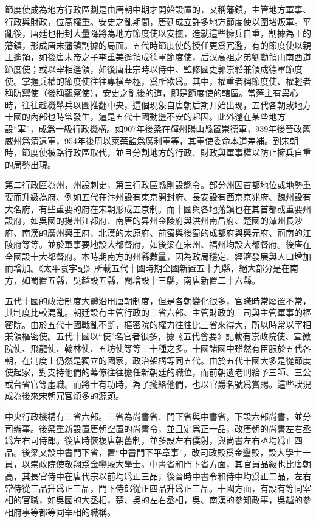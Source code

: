 節度使成為地方行政區劃是由唐朝中期才開始設置的，又稱藩鎮，主管地方軍事、行政與財政，位高權重。安史之亂期間，唐廷成立許多地方節度使以圍堵叛軍。平亂後，唐廷也冊封大量降將為地方節度使以安撫，造就這些擁兵自重，割據為王的藩鎮，形成唐末藩鎮割據的局面。五代時節度使的授任更爲冗濫，有的節度使以親王遙領，如後唐末帝之子李重美遙領成德軍節度使，后汉高祖之弟劉勳領山南西道節度使；或以宰相遙領，如後唐莊宗時以侍中、監修國史郭崇韜兼領成德軍節度使。掌握兵權的節度使往往專横至極，爲所欲爲。其中，權重者稱節度使、權輕者稱防禦使（後稱觀察使），安史之亂後的道，即是節度使的轄區。當藩主有異心時，往往趁機舉兵以圖推翻中央，這個現象自唐朝后期开始出现，五代各朝或地方十國的內部也時常發生，這是五代十國動盪不安的起因。此外還在某些地方設“軍”，成爲一級行政機構。如907年後梁在輝州碭山縣置崇德軍，939年後晉改舊威州爲清遠軍，954年後周以萊蕪監爲廣利軍等，其軍使委命本道差補。到宋朝時，節度使被路行政區取代，並且分割地方的行政、財政與軍事權以防止擁兵自重的局勢出現。

第二行政區為州，州設刺史，第三行政區縣則設縣令。部分州因首都地位或地勢重要而升級為府、例如五代在汴州設有東京開封府、長安設有西京京兆府、魏州設有大名府，有些重要的府在宋朝形成五京制。而十國與各地藩鎮也在其首都或重要州設府，如吳國的揚州江都府、南唐的昇州金陵府與洪州南昌府、楚國的潭州長沙府、南漢的廣州興王府、北漢的太原府、前蜀與後蜀的成都府與興元府、荊南的江陵府等等。並於軍事要地設大都督府，如後梁在宋州、福州均設大都督府。後唐在全國設十大都督府。本時期南方的州縣數量，因為政局穩定、經濟發展與人口增加而增加。《太平寰宇記》所載五代十國時期全國新置五十九縣，絕大部分是在南方，如蜀置五縣，吳越設五縣，閩增設十三縣，南唐新置二十六縣。

五代十國的政治制度大體沿用唐朝制度，但是各朝變化很多，官職時常廢置不常，其制度比較混亂。朝廷設有主管行政的三省六部、主管財政的三司與主管軍事的樞密院。由於五代十國戰亂不斷，樞密院的權力往往比三省來得大，所以時常以宰相兼領樞密使。五代十國以“使”名官者很多，據《五代會要》記載有崇政院使、宣徽院使、飛龍使、翰林使、五坊使等等三十種之多。十國諸國中雖然有臣服於五代各朝，在制度上仍然是獨立的國家，政治架構等同五代。由於五代十國大多是從節度使起家，對支持他們的幕僚往往擔任新朝廷的職位，而前朝遺老則給予三師、三公或台省官等虛職。而將士有功時，為了攏絡他們，也以官爵名號爲賞賜。這些狀況成為後來宋朝冗官煩多的源頭。

中央行政機構有三省六部。三省為尚書省、門下省與中書省，下設六部尚書，並分司辦事。後梁重新設置唐朝空置的尚書令，並且定爲正一品，改唐朝的尚書左右丞爲左右司侍郎。後唐時恢複唐朝舊制，並多設左右僕射，與尚書左右丞均爲正四品。後梁又設中書門下省，置“中書門下平章事”，改司政殿爲金鑾殿，設大學士一員，以崇政院使敬翔爲金鑾殿大學士。中書省和門下省方面，其官員品級也比唐朝高，其長官侍中在唐代宗以前均爲正三品，後晉時中書令和侍中均爲正二品，左右常侍從三品升爲正三品，門下侍郎從正四品升爲正三品。十國方面，有設有等同宰相的官職，如吳國的大丞相，楚、吳的左右丞相，吳、南漢的參知政事，吳越的參相府事等都等同宰相的職稱。

